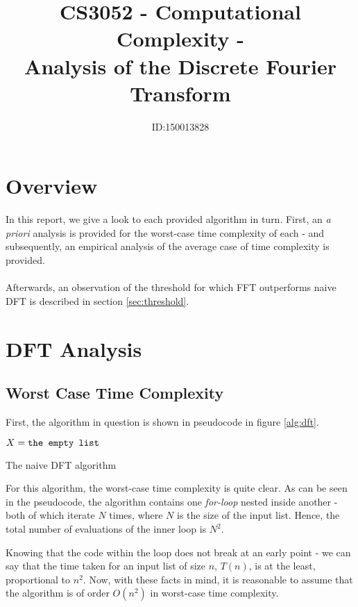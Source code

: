 \documentclass[]{article}
\title{CS3052 - Computational Complexity -\\Analysis of the Discrete Fourier Transform}
\author{ID:150013828}
\begin{document}
\maketitle

\section{Overview}
In this report, we give a look to each provided algorithm in turn. First, an \emph{a priori} analysis is provided for the worst-case time complexity of each - and subsequently, an empirical analysis of the average case of time complexity is provided.
\\\\
Afterwards, an observation of the threshold for which FFT outperforms naive DFT is described in section \ref{sec:threshold}.
\section{DFT Analysis}\label{sec:dft}
\subsection{Worst Case Time Complexity}
First, the algorithm in question is shown in pseudocode in figure \ref{alg:dft}.
\begin{algorithm}[h]
	$X = \verb|the empty list|$\\
\caption{The naive DFT algorithm\label{alg:dft}}
\end{algorithm}

For this algorithm, the worst-case time complexity is quite clear. As can be seen in the pseudocode, the algorithm contains one \emph{for-loop} nested inside another - both of which iterate $N$ times, where $N$ is the size of the input list. Hence, the total number of evaluations of the inner loop is $N^2$.

Knowing that the code within the loop does not break at an early point - we can say that the time taken for an input list of size $n$, $T(n)$, is at the least, proportional to $n^2$. Now, with these facts in mind, it is reasonable to assume that the algorithm is of order $O(n^2)$ in worst-case time complexity.
\end{document}
